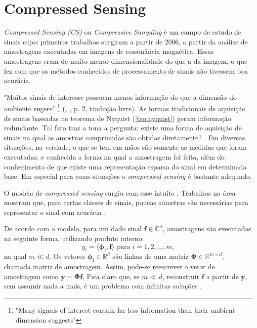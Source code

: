 \documentclass[cic,tc]{iiufrgs}
\renewcommand{\vec}[1]{\bm{#1}}
\begin{document}
\section{Compressed Sensing}
\textit{Compressed Sensing (CS)} ou \textit{Compressive Sampling} é um campo de estudo de sinais cujos
primeiros trabalhos surgiram a partir de 2006, a partir da análise de amostragens executadas em imagens de 
ressonância magnética. Essas amostragens eram de muito menor dimensionalidade do que a da imagem, o que 
fez com que os métodos conhecidos de processamento de sinais não tivessem boa acurácia.

"Muitos sinais de interesse possuem menos informação do que a dimensão do ambiente sugere"
\footnote{"Many signals of interest contain far less information than their ambient dimension suggests"}
(\citeauthor{chen2015compressed}, \citeyear{chen2015compressed}, p. 2, tradução livre).
As formas tradicionais de aquisição de sinais baseadas no teorema de Nyquist (\ref{teo:nyquist}) 
geram informação redundante.
Tal fato traz a tona a pergunta: existe 
uma forma de aquisição de sinais na qual as amostras comprimidas são obtidas diretamente? \cite{chen2015compressed}.
Em diversas situações, na verdade, o que se tem em mãos são somente as medidas que foram executadas, 
e conhecida a forma na qual a amostragem foi feita, além do conhecimento de que existe uma representação
esparsa do sinal em determinada base.
Em especial para essas situações o \emph{compressed sensing} é bastante adequado.

O modelo de \emph{compressed sensing} surgiu com esse intuito \cite{DonohoCS}. Trabalhos na área mostram que, para certas classes
de sinais, poucas amostras são necessárias para representar o sinal com acurácia \cite{chen2015compressed}.

De acordo com o modelo, para um dado sinal $ \vec{f} \in \mathbb{C}^d $, 
amostragens são executadas na seguinte forma, utilizando produto interno:
\begin{equation}
    y_i = \langle \vec{\phi_i}, \vec{f} \rangle \text{ para } i=1,2,...,m, 
\end{equation}
na qual $m \ll d$. Os vetores $\vec{\phi_i} \in \mathbb{R}^d$ são linhas de uma matriz $\mathbf{\Phi} \in \mathbb{R}^{m \times d}$, chamada matriz 
de amostragem. Assim, pode-se reescrever o vetor de amostragem como $\vec{y} = \mathbf{\Phi} \vec{f}$. Fica claro que, 
se $ m \ll d$, reconstruir $\vec{f}$ a partir de $\vec{y}$, sem assumir nada a mais, é um problema 
com infinitas soluções \cite{chen2015compressed}.
\end{document}
